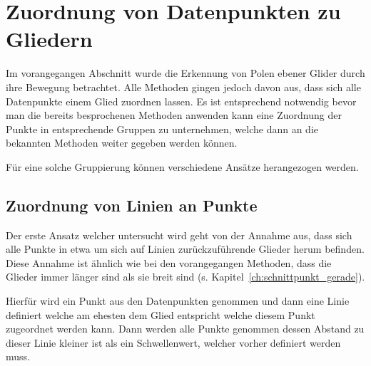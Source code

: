 

\chapter{Zuordnung von Datenpunkten zu Gliedern} \label{ch:gruppierung_von_datenpunkten}


Im vorangegangen Abschnitt wurde die Erkennung von Polen ebener Glider durch ihre Bewegung betrachtet.
Alle Methoden gingen jedoch davon aus, dass sich alle Datenpunkte einem Glied zuordnen lassen.
Es ist entsprechend notwendig bevor man die bereits besprochenen Methoden anwenden kann eine Zuordnung der Punkte in entsprechende Gruppen zu unternehmen, welche dann an die bekannten Methoden weiter gegeben werden können.

Für eine solche Gruppierung können verschiedene Ansätze herangezogen werden.

\section{Zuordnung von Linien an Punkte}

Der erste Ansatz welcher untersucht wird geht von der Annahme aus, dass sich alle Punkte in etwa um sich auf Linien zurückzuführende Glieder herum befinden.
Diese Annahme ist ähnlich wie bei den vorangegangen Methoden, dass die Glieder immer länger sind als sie breit sind (s. Kapitel~\ref{ch:schnittpunkt_gerade}).

Hierfür wird ein Punkt aus den Datenpunkten genommen und dann eine Linie definiert welche am ehesten dem Glied entspricht welche diesem Punkt zugeordnet werden kann.
Dann werden alle Punkte genommen dessen Abstand zu dieser Linie kleiner ist als ein Schwellenwert, welcher vorher definiert werden muss.

